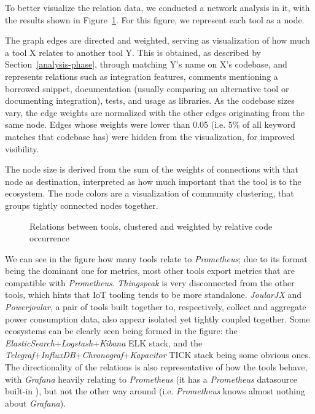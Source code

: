 \documentclass[sigconf]{acmart}
\begin{document}
To better visualize the relation data, we conducted a network analysis in
it, with the results shown in Figure~\ref{fig-relations}. For this figure,
we represent each tool as a node.

The graph edges are directed and weighted, serving as visualization of how
much a tool X relates to another tool Y. This is obtained, as described by
Section~\ref{analysis-phase}, through matching Y's name on X's codebase,
and represents relations such as integration features, comments mentioning
a borrowed snippet, documentation (usually comparing an alternative tool or
documenting integration), tests, and usage as libraries. As the codebase sizes
vary, the edge weights are normalized with the other edges originating from the
same node. Edges whose weights were lower than 0.05 (i.e. 5\% of all keyword
matches that codebase has) were hidden from the visualization, for improved
visibility.

The node size is derived from the sum of the weights of connections with that
node as destination, interpreted as how much important that the tool is to the
ecosystem. The node colors are a visualization of community clustering, that
groups tightly connected nodes together.

\begin{figure}[!htbp]
  \centering
  
  \caption{Relations between tools, clustered and weighted by relative code occurrence}
  \label{fig-relations}
\end{figure}

We can see in the figure how many tools relate to
\emph{Prometheus}; due to its format being the dominant one for metrics,
most other tools export metrics that are compatible with
\emph{Prometheus}. \emph{Thingspeak} is very disconnected from the other
tools, which hints that IoT tooling tends to be more standalone.
\emph{JoularJX} and \emph{Powerjoular}, a pair of tools built together
to, respectively, collect and aggregate power consumption data, also
appear isolated yet tightly coupled together. Some ecosystems can be
clearly seen being formed in the figure: the
\emph{ElasticSearch}+\emph{Logstash}+\emph{Kibana} ELK stack, and the
\emph{Telegraf}+\emph{InfluxDB}+\emph{Chronograf}+\emph{Kapacitor} TICK
stack being some obvious ones. The directionality of the relations is
also representative of how the tools behave, with \emph{Grafana} heavily
relating to \emph{Prometheus} (it has a \emph{Prometheus} datasource
built-in \cite{grafana-prometheus-docs}), but not the other way
around (i.e. \emph{Prometheus} knows almost nothing about
\emph{Grafana}).
\end{document}
